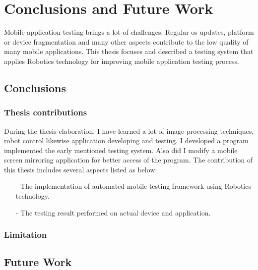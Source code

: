 \chapter{Conclusions and Future Work}
Mobile application testing brings a lot of challenges. Regular \acrshort{os} updates, platform or device fragmentation and many other aspects contribute to the low quality of many mobile applications. This thesis focuses and described a testing system that applies Robotics technology for improving mobile application testing process.

\section{Conclusions}
\subsection{Thesis contributions}
During the thesis elaboration, I have learned a lot of image processing techniques, robot control likewise application developing and testing.
I developed a program implemented the early mentioned testing system. Also did I modify a mobile screen mirroring application for better access of the program.
\newline
The contribution of this thesis includes several aspects listed as below:
	\begin{itemize}
		\item[-] The implementation of automated mobile testing framework using Robotics technology.
		\item[-] The testing result performed on actual device and application.
	\end{itemize}

\subsection{Limitation}

\section{Future Work}
